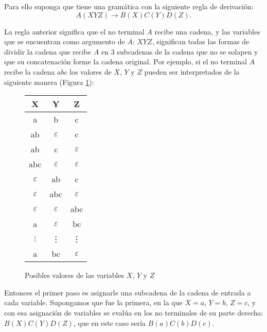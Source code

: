 \documentclass[12pt]{article}
\begin{document}
Para ello suponga que tiene una gramática con la siguiente regla de derivación:
$$A(XYZ)\to B(X)C(Y)D(Z).$$

La regla anterior significa que el no terminal $A$ recibe una cadena, y las variables que se encuentran como argumento
de $A$: $XYZ$, significan todas las formas de dividir la cadena que recibe $A$ en 3 subcadenas de la cadena que no se solapen
y que su concatenación forme la cadena original. Por ejemplo, si el no terminal $A$ recibe la cadena $abc$ los valores de $X$, $Y$ y $Z$
pueden ser interpretados de la siguiente manera (Figura \ref{fig:xyz_eaxmple}):

\begin{figure}
    \centering
    \begin{tabular}{|c|c|c|}
        \hline
        X             & Y             & Z             \\
        \hline
        a             & b             & c             \\
        \hline
        ab            & $\varepsilon$ & c             \\
        \hline
        ab            & c             & $\varepsilon$ \\
        \hline
        abc           & $\varepsilon$ & $\varepsilon$ \\
        \hline
        $\varepsilon$ & ab            & c             \\
        \hline
        $\varepsilon$ & abc           & $\varepsilon$ \\
        \hline
        $\varepsilon$ & $\varepsilon$ & abc           \\
        \hline
        a             & $\varepsilon$ & bc            \\
        \hline
        $\vdots$      & \vdots        & \vdots        \\
        \hline
        a             & bc            & $\varepsilon$ \\
        \hline
    \end{tabular}
    \caption{Posibles valores de las variables $X$, $Y$ y $Z$}
    \label{fig:xyz_eaxmple}
\end{figure}

Entonces el primer paso es asignarle una subcadena de la cadena de entrada a cada variable.
Supongamos que fue la primera, en la que $X=a$, $Y = b$, $Z = c$, y con esa asignación de variables
se evalúa en los no terminales de su parte derecha: $B(X)C(Y)D(Z)$, que en este caso sería $B(a)C(b)D(c)$.
\end{document}
